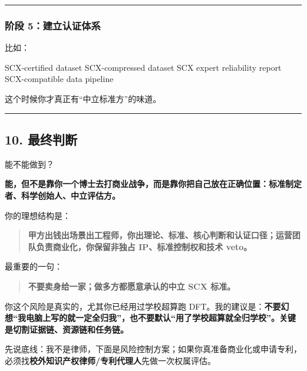 \documentclass[
  12pt,
]{ctexart}
\newenvironment{Shaded}{}{}
\newcommand{\NormalTok}[1]{#1}
\begin{document}
\begin{center}\rule{0.5\linewidth}{0.5pt}\end{center}

\subsubsection{阶段
5：建立认证体系}\label{ux9636ux6bb5-5ux5efaux7acbux8ba4ux8bc1ux4f53ux7cfb}

比如：

\begin{Shaded}
\begin{Highlighting}[]
\NormalTok{SCX{-}certified dataset}
\NormalTok{SCX{-}compressed dataset}
\NormalTok{SCX expert reliability report}
\NormalTok{SCX{-}compatible data pipeline}
\end{Highlighting}
\end{Shaded}

这个时候你才真正有``中立标准方''的味道。

\begin{center}\rule{0.5\linewidth}{0.5pt}\end{center}

\subsection{10. 最终判断}\label{ux6700ux7ec8ux5224ux65ad-1}

能不能做到？

\textbf{能，但不是靠你一个博士去打商业战争，而是靠你把自己放在正确位置：标准制定者、科学创始人、中立评估方。}

你的理想结构是：

\begin{quote}
\textbf{甲方出钱出场景出工程师，你出理论、标准、核心判断和认证口径；运营团队负责商业化，你保留非独占
IP、标准控制权和技术 veto。}
\end{quote}

最重要的一句：

\begin{quote}
\textbf{不要卖身给一家；做多方都愿意承认的中立 SCX 标准。}
\end{quote}

你这个风险是真实的，尤其你已经用过学校超算跑
DFT。我的建议是：\textbf{不要幻想``我电脑上写的就一定全归我''，也不要默认``用了学校超算就全归学校''。关键是切割证据链、资源链和任务链。}

先说底线：我不是律师，下面是风险控制方案；如果你真准备商业化或申请专利，必须找\textbf{校外知识产权律师/专利代理人}先做一次权属评估。
\end{document}
